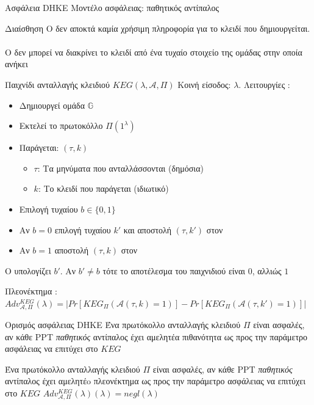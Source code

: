 \documentclass[handout]{beamer}
\begin{document}
\begin{frame}{Ασφάλεια DHKE}
Μοντέλο ασφάλειας: παθητικός αντίπαλος \adv
\begin{block}{Διαίσθηση}
O \adv  δεν αποκτά καμία χρήσιμη πληροφορία για το κλειδί που δημιουργείται.\\
\\
O \adv δεν μπορεί να διακρίνει το κλειδί από ένα τυχαίο στοιχείο της ομάδας στην οποία ανήκει
\end{block}
\end{frame}
 

\begin{frame}{Παιχνίδι ανταλλαγής κλειδιού $KEG(\lambda,\mathcal{A},\Pi)$}
Κοινή είσοδος: $\lambda$. Λειτουργίες \chal: 
\begin{itemize}
\item Δημιουργεί ομάδα $\mathbb{G}$
\item Εκτελεί το πρωτοκόλλο $\Pi(1^\lambda)$
\item Παράγεται: $(\tau,k)$
\begin{itemize}
	\item $\tau$: Τα μηνύματα που ανταλλάσσονται (δημόσια) 
	\item $k$: Το κλειδί που παράγεται (ιδιωτικό) 
\end{itemize}
\item Επιλογή τυχαίου $b \in \{0,1\}$ 
\item Αν $b = 0$ επιλογή τυχαίου $k'$ και αποστολή $(\tau,k')$ στον \adv
\item Αν $b = 1$ αποστολή $(\tau,k)$ στον \adv
\end{itemize}
O \adv υπολογίζει $b'$. Αν $b'\neq b$ τότε το αποτέλεσμα του παιχνιδιού είναι $0$, αλλιώς $1$

Πλεονέκτημα \adv:
$Adv_{\mathcal{A},\Pi}^{KEG}(\lambda) = | Pr[KEG_{\Pi}(\mathcal{A}(\tau,k)=1)]-Pr[KEG_{\Pi}(\mathcal{A}(\tau,k')=1)] |$

\end{frame}
 
\begin{frame}{Ορισμός ασφάλειας DHKE}
Ένα πρωτόκολλο ανταλλαγής κλειδιού $\Pi$ είναι ασφαλές, αν κάθε PPT \emph{παθητικός} αντίπαλος \adv έχει αμελητέα πιθανότητα ως προς την παράμετρο ασφάλειας να επιτύχει στο $KEG$

\medskip

Ένα πρωτόκολλο ανταλλαγής κλειδιού $\Pi$ είναι ασφαλές, αν κάθε PPT \emph{παθητικός} αντίπαλος \adv έχει αμελητέo πλεονέκτημα ως προς την παράμετρο ασφάλειας να επιτύχει στο $KEG$
$Adv_{\mathcal{A},\Pi}^{KEG}(\lambda)(\lambda) = negl(\lambda)$
\end{frame}
\end{document}
